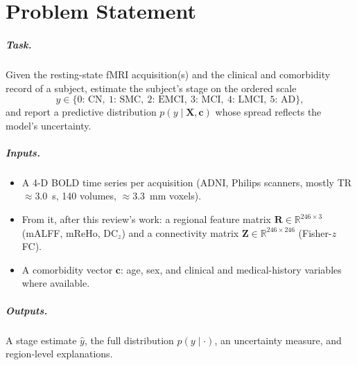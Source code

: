 \documentclass{ssnreview}
\begin{document}
\chapter{Problem Statement}\label{ch:problem}

\paragraph{Task.} Given the resting-state fMRI acquisition(s) and the clinical
and comorbidity record of a subject, estimate the subject's stage on the
ordered scale
\[
  y \in \{0{:}\,\text{CN},\ 1{:}\,\text{SMC},\ 2{:}\,\text{EMCI},\
  3{:}\,\text{MCI},\ 4{:}\,\text{LMCI},\ 5{:}\,\text{AD}\},
\]
and report a predictive distribution $p(y \mid \mathbf{X}, \mathbf{c})$ whose
spread reflects the model's uncertainty.

\paragraph{Inputs.}
\begin{itemize}
  \item A 4-D BOLD time series per acquisition (ADNI, Philips scanners,
        mostly TR $\approx 3.0$~s, 140 volumes, $\approx 3.3$~mm voxels).
  \item From it, after this review's work: a regional feature matrix
        $\mathbf{R} \in \mathbb{R}^{246\times3}$ (mALFF, mReHo, DC$_z$) and a
        connectivity matrix $\mathbf{Z} \in \mathbb{R}^{246\times246}$
        (Fisher-$z$ FC).
  \item A comorbidity vector $\mathbf{c}$: age, sex, and clinical and
        medical-history variables where available.
\end{itemize}

\paragraph{Outputs.} A stage estimate $\hat{y}$, the full distribution
$p(y\mid\cdot)$, an uncertainty measure, and region-level explanations.
\end{document}
